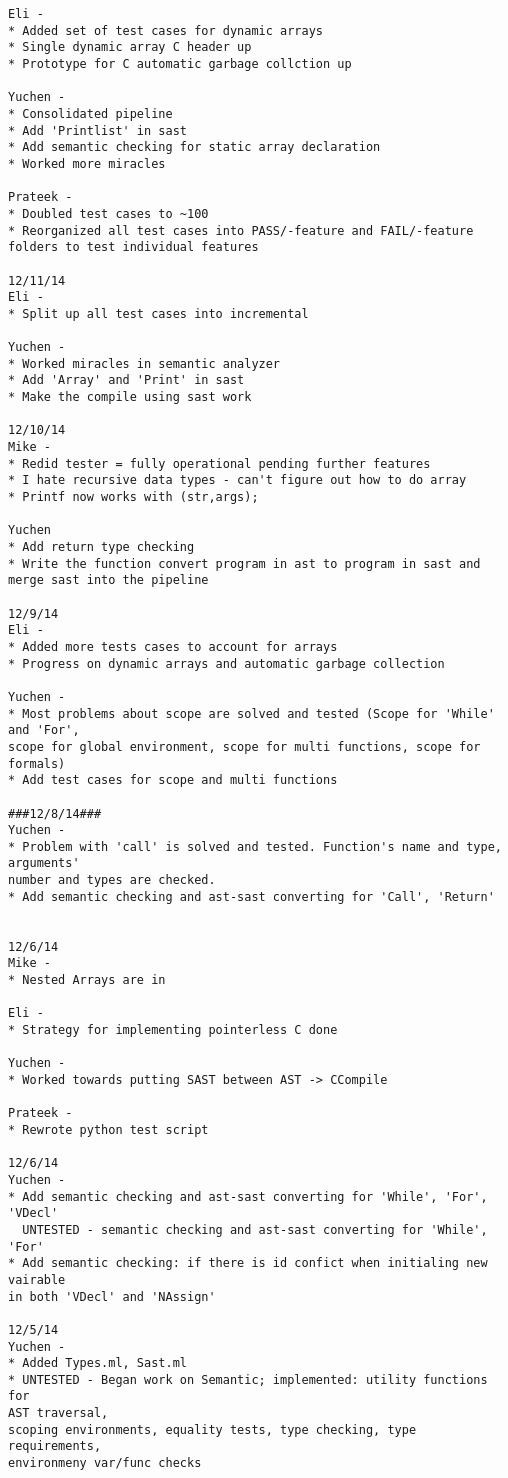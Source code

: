 \documentclass[a4paper]{article}
\begin{document}
\begin{description}
\begin{verbatim}
Eli -
* Added set of test cases for dynamic arrays
* Single dynamic array C header up
* Prototype for C automatic garbage collction up

Yuchen -
* Consolidated pipeline
* Add 'Printlist' in sast
* Add semantic checking for static array declaration
* Worked more miracles

Prateek -
* Doubled test cases to ~100
* Reorganized all test cases into PASS/-feature and FAIL/-feature 
folders to test individual features

12/11/14
Eli -
* Split up all test cases into incremental

Yuchen -
* Worked miracles in semantic analyzer
* Add 'Array' and 'Print' in sast
* Make the compile using sast work

12/10/14
Mike -
* Redid tester = fully operational pending further features
* I hate recursive data types - can't figure out how to do array
* Printf now works with (str,args);

Yuchen
* Add return type checking
* Write the function convert program in ast to program in sast and 
merge sast into the pipeline

12/9/14
Eli -
* Added more tests cases to account for arrays
* Progress on dynamic arrays and automatic garbage collection

Yuchen -
* Most problems about scope are solved and tested (Scope for 'While' and 'For', 
scope for global environment, scope for multi functions, scope for formals)
* Add test cases for scope and multi functions

###12/8/14###
Yuchen -
* Problem with 'call' is solved and tested. Function's name and type, arguments' 
number and types are checked.
* Add semantic checking and ast-sast converting for 'Call', 'Return'


12/6/14
Mike -
* Nested Arrays are in

Eli -
* Strategy for implementing pointerless C done

Yuchen - 
* Worked towards putting SAST between AST -> CCompile

Prateek - 
* Rewrote python test script

12/6/14
Yuchen - 
* Add semantic checking and ast-sast converting for 'While', 'For', 'VDecl' 
  UNTESTED - semantic checking and ast-sast converting for 'While', 'For'
* Add semantic checking: if there is id confict when initialing new vairable 
in both 'VDecl' and 'NAssign'

12/5/14
Yuchen -
* Added Types.ml, Sast.ml
* UNTESTED - Began work on Semantic; implemented: utility functions for 
AST traversal, 
scoping environments, equality tests, type checking, type requirements, 
environmeny var/func checks


\end{verbatim}
\end{description}
\end{document}
